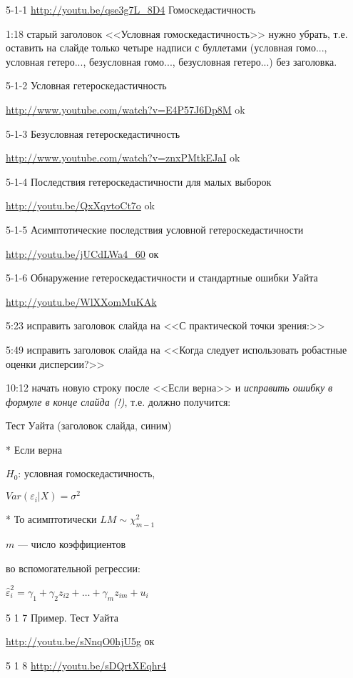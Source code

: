 \documentclass[12pt,a4paper]{article}
\newcommand{\e}{\varepsilon}
\begin{document}
5-1-1 \url{http://youtu.be/qse3g7L_8D4} Гомоскедастичность

1:18 старый заголовок <<Условная гомоскедастичность>> нужно убрать, т.е. оставить на слайде только четыре надписи с буллетами (условная гомо..., условная гетеро..., безусловная гомо..., безусловная гетеро...) без заголовка.

5-1-2 Условная гетероскедастичность 

\url{http://www.youtube.com/watch?v=E4P57J6Dp8M}   ok 

5-1-3  Безусловная гетероскедастичность 

\url{http://www.youtube.com/watch?v=znxPMtkEJaI}  ok

5-1-4 Последствия гетероскедастичности для малых выборок 

\url{http://youtu.be/QxXqvtoCt7o} ok

5-1-5 Асимптотические последствия условной гетероскедастичности

\url{http://youtu.be/jUCdLWa4_60} ок

5-1-6 Обнаружение гетероскедастичности и стандартные ошибки Уайта

\url{http://youtu.be/WlXXomMuKAk}

5:23 исправить заголовок слайда на <<С практической точки зрения:>>

5:49 исправить заголовок слайда на <<Когда следует использовать робастные оценки дисперсии?>>

10:12 начать новую строку после <<Если верна>> и \textit{исправить ошибку в формуле в конце слайда (!)}, т.е. должно получится:

Тест Уайта (заголовок слайда, синим)


* Если верна

$H_0$: условная гомоскедастичность, 

$Var(\e_i|X)=\sigma^2$

* То асимптотически $LM\sim \chi^2_{m-1}$

$m$ --- число коэффициентов 

во вспомогательной регрессии:

$\hat{\varepsilon}^2_i = \gamma_1 + \gamma_2 z_{i2} + \ldots + \gamma_{m} z_{im}+ u_i$

5 1 7 Пример. Тест Уайта

\url{http://youtu.be/sNnqO0hjU5g} ок

5 1 8 \url{http://youtu.be/sDQrtXEqhr4}
\end{document}
